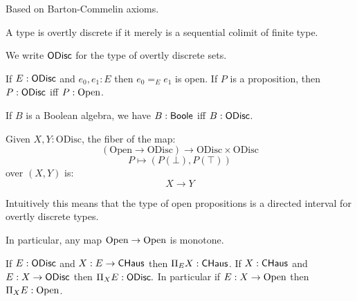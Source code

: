 Based on Barton-Commelin axioms. 

\begin{definition}
A type is overtly discrete if it merely is a sequential colimit of finite type.
\end{definition}

We write $\mathsf{ODisc}$ for the type of overtly discrete sets.

\begin{proposition}
  If $E:\mathsf{ODisc}$ and $e_0,e_1:E$ then $e_0=_E e_1$ is open. If $P$ is a proposition, then $P:\mathsf{ODisc}$
  iff $P:\mathrm{Open}$.
\end{proposition}

\begin{proposition}
  If $B$ is a Boolean algebra, we have $B:\mathsf{Boole}$ iff $B:\mathsf{ODisc}$.
\end{proposition}

\begin{theorem}
Given $X,Y:\mathrm{ODisc}$, the fiber of the map:
\[ (\mathrm{Open}\to \mathrm{ODisc}) \to \mathrm{ODisc}\times \mathrm{ODisc}\]
\[ P \mapsto (P(\bot),P(\top))\]
over $(X,Y)$ is:
\[X\to Y\]
\end{theorem}

Intuitively this means that the type of open propositions is a directed interval for overtly discrete types.

In particular, any map $\mathrm{Open}\rightarrow\mathrm{Open}$ is monotone.

\begin{theorem}[Tychonoff]
  If $E:\mathsf{ODisc}$ and $X:E\rightarrow\mathsf{CHaus}$ then $\Pi_EX:\mathsf{CHaus}$. If $X:\mathsf{CHaus}$ and $E:X\rightarrow\mathsf{ODisc}$ then
  $\Pi_XE:\mathsf{ODisc}.$ In particular if $E:X\rightarrow\mathrm{Open}$ then $\Pi_XE:\mathrm{Open}$.
\end{theorem}


